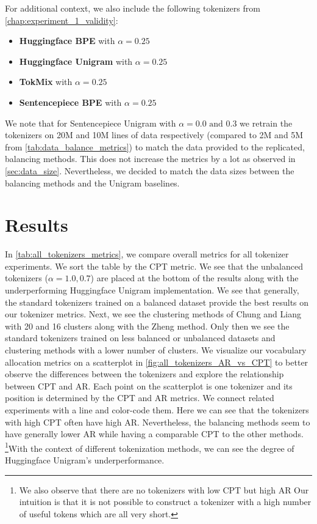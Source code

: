 For additional context, we also include the following tokenizers from \autoref{chap:experiment_1_validity}:
\begin{itemize}
    \item \textbf{Huggingface BPE} with $\alpha=0.25$
    \item \textbf{Huggingface Unigram} with $\alpha=0.25$
    \item \textbf{TokMix} with $\alpha=0.25$
    \item \textbf{Sentencepiece BPE} with $\alpha=0.25$
\end{itemize}

We note that for Sentencepiece Unigram with $\alpha=0.0\text{ and }0.3$ we retrain the tokenizers on 20M and 10M lines of data respectively (compared to 2M and 5M from \autoref{tab:data_balance_metrics}) to match the data provided to the replicated, balancing methods. This does not increase the metrics by a lot as observed in \autoref{sec:data_size}. Nevertheless, we decided to match the data sizes between the balancing methods and the Unigram baselines.


\section{Results}



In \autoref{tab:all_tokenizers_metrics}, we compare overall metrics for all tokenizer experiments. We sort the table by the CPT metric. We see that the unbalanced tokenizers ($\alpha=1.0, 0.7$) are placed at the bottom of the results along with the underperforming Huggingface Unigram implementation. We see that generally, the standard tokenizers trained on a balanced dataset provide the best results on our tokenizer metrics. Next, we see the clustering methods of Chung and Liang with 20 and 16 clusters along with the Zheng method. Only then we see the standard tokenizers trained on less balanced or unbalanced datasets and clustering methods with a lower number of clusters. We visualize our vocabulary allocation metrics on a scatterplot in \autoref{fig:all_tokenizers_AR_vs_CPT} to better observe the differences between the tokenizers and explore the relationship between CPT and AR. Each point on the scatterplot is one tokenizer and its position is determined by the CPT and AR metrics. We connect related experiments with a line and color-code them. Here we can see that the tokenizers with high CPT often have high AR. Nevertheless, the balancing methods seem to have generally lower AR while having a comparable CPT to the other methods. \footnote{We also observe that there are no tokenizers with low CPT but high AR Our intuition is that it is not possible to construct a tokenizer with a high number of useful tokens which are all very short.}With the context of different tokenization methods, we can see the degree of Huggingface Unigram's underperformance.

